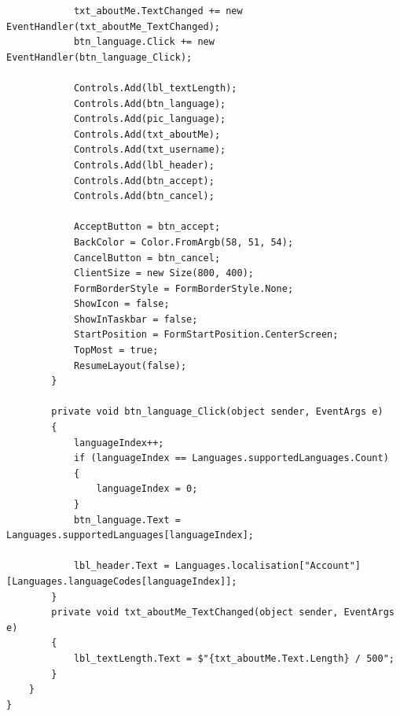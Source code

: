 \documentclass{article}
\begin{document}
\begin{verbatim}
			txt_aboutMe.TextChanged += new EventHandler(txt_aboutMe_TextChanged);
			btn_language.Click += new EventHandler(btn_language_Click);

			Controls.Add(lbl_textLength);
			Controls.Add(btn_language);
			Controls.Add(pic_language);
			Controls.Add(txt_aboutMe);
			Controls.Add(txt_username);
			Controls.Add(lbl_header);
			Controls.Add(btn_accept);
			Controls.Add(btn_cancel);

			AcceptButton = btn_accept;
			BackColor = Color.FromArgb(58, 51, 54);
			CancelButton = btn_cancel;
			ClientSize = new Size(800, 400);
			FormBorderStyle = FormBorderStyle.None;
			ShowIcon = false;
			ShowInTaskbar = false;
			StartPosition = FormStartPosition.CenterScreen;
			TopMost = true;
			ResumeLayout(false);
		}

		private void btn_language_Click(object sender, EventArgs e)
		{
			languageIndex++;
			if (languageIndex == Languages.supportedLanguages.Count)
			{
				languageIndex = 0;
			}
			btn_language.Text = Languages.supportedLanguages[languageIndex];

			lbl_header.Text = Languages.localisation["Account"][Languages.languageCodes[languageIndex]];
		}
		private void txt_aboutMe_TextChanged(object sender, EventArgs e)
		{
			lbl_textLength.Text = $"{txt_aboutMe.Text.Length} / 500";
		}
	}
}
\end{verbatim}
\end{document}
